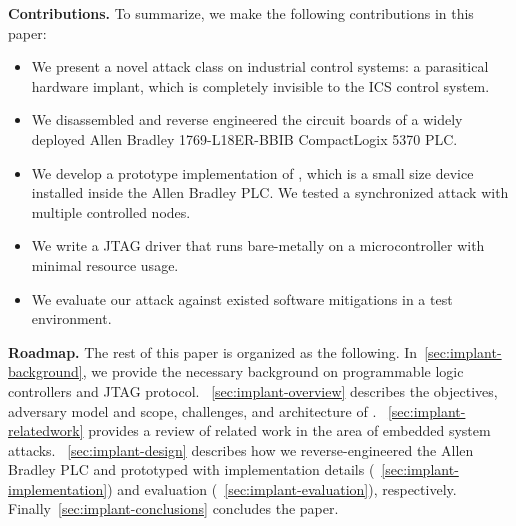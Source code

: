 \textbf{Contributions.} To summarize, we make the following contributions in this paper:
\begin{itemize}[leftmargin=*]
	\item We present a novel attack class on industrial control systems: a parasitical hardware implant, which is completely invisible to the ICS control system.
	\item We disassembled and reverse engineered the circuit boards of a widely deployed Allen Bradley 1769-L18ER-BBIB CompactLogix 5370 PLC. 
	\item We develop a prototype implementation of \name, which is a small size device installed inside the Allen Bradley PLC. We tested a synchronized attack with multiple controlled nodes. 
	\item We write a JTAG driver that runs bare-metally on a microcontroller with minimal resource usage.
	\item We evaluate our attack against existed software mitigations in a test environment.

\end{itemize}


\textbf{Roadmap.} The rest of this paper is organized as the following. In~\autoref{sec:implant-background}, we provide the necessary background on programmable logic controllers and JTAG protocol. ~\autoref{sec:implant-overview} describes the objectives, adversary model and scope, challenges, and architecture of \name. ~\autoref{sec:implant-relatedwork} provides a review of related work in the area of embedded system attacks. ~\autoref{sec:implant-design} describes how we reverse-engineered the Allen Bradley PLC and prototyped \name with implementation details (~\autoref{sec:implant-implementation}) and evaluation (~\autoref{sec:implant-evaluation}), respectively.  Finally~\autoref{sec:implant-conclusions} concludes the paper.
